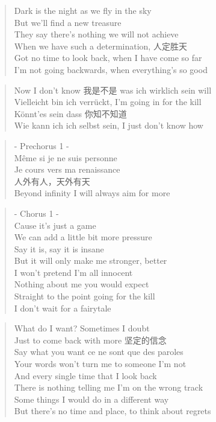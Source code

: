 
\begin{verse}
Dark is the night as we fly in the sky\\
But we'll find a new treasure\\
They say there's nothing we will not achieve\\
When we have such a determination, 人定胜天\\
Got no time to look back, when I have come so far\\
I'm not going backwards, when everything's so good
\end{verse}

\begin{verse}
Now I don't know 我是不是 was ich wirklich sein will\\
Vielleicht bin ich verrückt, I'm going in for the kill\\
Könnt'es sein dass 你知不知道\\
Wie kann ich ich selbst sein, I just don't know how
\end{verse}

\begin{verse}
- Prechorus 1 -\\
Même si je ne suis personne\\
Je cours vers ma renaissance\\
人外有人，天外有天\\
Beyond infinity I will always aim for more
\end{verse}

\begin{verse}
- Chorus 1 -\\
Cause it's just a game\\
We can add a little bit more pressure\\
Say it is, say it is insane\\
But it will only make me stronger, better\\
I won't pretend I'm all innocent\\
Nothing about me you would expect\\
Straight to the point going for the kill\\
I don't wait for a fairytale
\end{verse}

\clearpage
{}

\begin{verse}
What do I want? Sometimes I doubt\\
Just to come back with more 坚定的信念\\
Say what you want ce ne sont que des paroles\\
Your words won't turn me to someone I'm not\\
And every single time that I look back\\
There is nothing telling me I'm on the wrong track\\
Some things I would do in a different way\\
But there's no time and place, to think about regrets
\end{verse}

